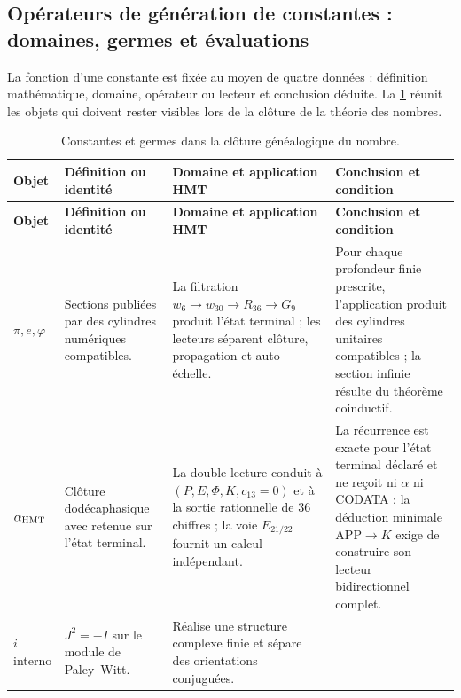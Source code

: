 \subsection{Opérateurs de génération de constantes : domaines, germes et évaluations}

La fonction d'une constante est fixée au moyen de quatre données : définition
mathématique, domaine, opérateur ou lecteur et conclusion déduite. La
\cref{p3-83-c44-s2:tab:semillas-cierre-genealogico-numero} réunit les objets qui doivent
rester visibles lors de la clôture de la théorie des nombres.

\begingroup
\small
\setlength{\LTpre}{0.5\baselineskip}
\setlength{\LTpost}{0.5\baselineskip}
\begin{longtable}{@{}>{\raggedright\arraybackslash}p{}
                    >{\raggedright\arraybackslash}p{}
                    >{\raggedright\arraybackslash}p{}
                    >{\raggedright\arraybackslash}p{}@{}}
\caption{Constantes et germes dans la clôture généalogique du nombre.}
\label{p3-83-c44-s2:tab:semillas-cierre-genealogico-numero}\\
\toprule
\textbf{Objet} & \textbf{Définition ou identité} &
\textbf{Domaine et application HMT} & \textbf{Conclusion et condition}\\
\midrule
\endfirsthead
\toprule
\textbf{Objet} & \textbf{Définition ou identité} &
\textbf{Domaine et application HMT} & \textbf{Conclusion et condition}\\
\midrule
\endhead
\(\pi,e,\varphi\) &
Sections publiées par des cylindres numériques compatibles. &
La filtration
\(w_6\to w_{30}\to R_{36}\to G_9\) produit l'état terminal ; les lecteurs
séparent clôture, propagation et auto-échelle. &
Pour chaque profondeur finie prescrite, l'application produit des cylindres unitaires
compatibles ; la section infinie résulte du théorème coinductif.\\
\(\alpha_{\rm HMT}\) &
Clôture dodécaphasique avec retenue sur l'état terminal. &
La double lecture conduit à
\((P,E,\Phi,K,c_{13}=0)\) et à la sortie rationnelle de \(36\) chiffres ; la voie
\(E_{21/22}\) fournit un calcul indépendant. &
La récurrence est exacte pour l'état terminal déclaré et ne reçoit ni
\(\alpha\) ni CODATA ; la déduction minimale APP\(\to K\) exige de construire son
lecteur bidirectionnel complet.\\
\(i\) interno &
\(J^2=-I\) sur le module de Paley--Witt. &
Réalise une structure complexe finie et sépare des orientations conjuguées. &

\end{longtable}
